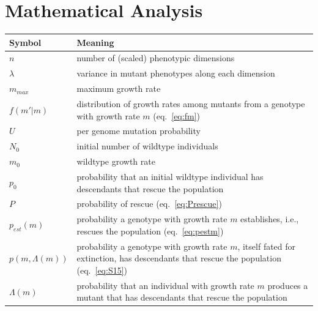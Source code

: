 \documentclass[9pt,twocolumn,twoside,lineno]{gsajnl}
\begin{document}
\section{Mathematical Analysis}
\label{sec:analysis}

\begin{table}[!h]
\begin{tabular}{p{1.5cm} p{6.5cm}}
\hline
Symbol & Meaning \\
\hline
\hline
$n$ & number of (scaled) phenotypic dimensions\\
$\lambda$ & variance in mutant phenotypes along each dimension\\
$m_{max}$ & maximum growth rate\\
$f(m'|m)$ & distribution of growth rates among mutants from a genotype with growth rate $m$ (eq.\ \ref{eq:fm})\\
$U$ & per genome mutation probability\\ 
$N_0$ & initial number of wildtype individuals\\
$m_0$ & wildtype growth rate\\
$p_0$ & probability that an initial wildtype individual has descendants that rescue the population\\
$P$ & probability of rescue (eq.\ \ref{eq:Prescue})\\
$p_{est}(m)$ & probability a genotype with growth rate $m$ establishes, i.e., rescues the population (eq.\ \ref{eq:pestm})\\
$p(m,\Lambda(m))$ & probability a genotype with growth rate $m$, itself fated for extinction, has descendants that rescue the population (eq.\ \ref{eq:S15})\\
$\Lambda(m)$ & probability that an individual with growth rate $m$ produces a mutant that has descendants that rescue the population\\

\end{tabular}
\end{table}
\end{document}
